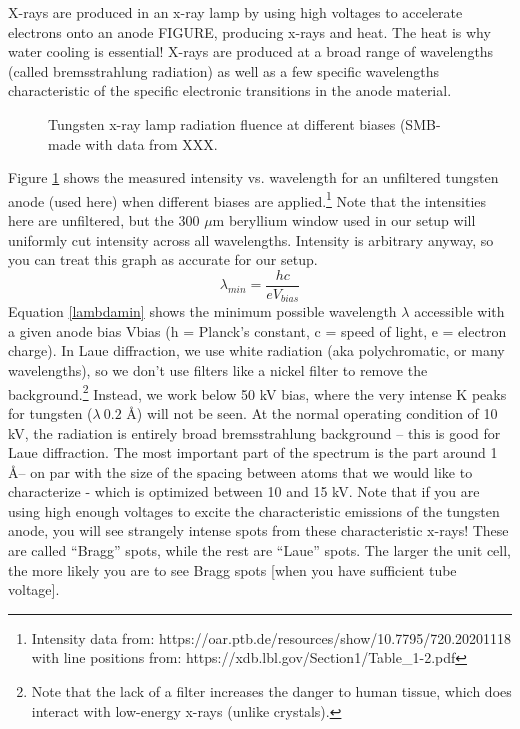 X-rays are produced in an x-ray lamp by using high voltages to accelerate electrons onto an anode FIGURE, producing x-rays and heat. The heat is why water cooling is essential! X-rays are produced at a broad range of wavelengths (called bremsstrahlung radiation) as well as a few specific wavelengths characteristic of the specific electronic transitions in the anode material.
\begin{figure}[htbp]
  \centering
  
  \caption{Tungsten x-ray lamp radiation fluence at different biases (SMB-made with data from XXX.}
  \label{Wradiation}
\end{figure}
Figure \ref{Wradiation} shows the measured intensity vs. wavelength for an unfiltered tungsten anode (used here) when different biases are applied.\footnote{Intensity data from: https://oar.ptb.de/resources/show/10.7795/720.20201118 with line positions from: https://xdb.lbl.gov/Section1/Table_1-2.pdf }  Note that the intensities here are unfiltered, but the 300 $\mu$m beryllium window used in our setup will uniformly cut intensity across all wavelengths. Intensity is arbitrary anyway, so you can treat this graph as accurate for our setup.
\begin{equation}
    \lambda_{min} = \frac{hc}{eV_{bias} }
    \label{lambdamin}
\end{equation}
Equation \ref{lambdamin} shows the minimum possible wavelength $\lambda$ accessible with a given anode bias Vbias (h = Planck’s constant, c = speed of light, e = electron charge). In Laue diffraction, we use white radiation (aka polychromatic, or many wavelengths), so we don’t use filters like a nickel filter to remove the background.\footnote{Note that the lack of a filter increases the danger to human tissue, which does interact with low-energy x-rays (unlike crystals).} Instead, we work below 50 kV bias, where the very intense K peaks for tungsten ($\lambda~0.2 $ \AA) will not be seen. At the normal operating condition of 10 kV, the radiation is entirely broad bremsstrahlung background – this is good for Laue diffraction. The most important part of the spectrum is the part around 1 \AA – on par with the size of the spacing between atoms that we would like to characterize - which is optimized between 10 and 15 kV.
Note that if you are using high enough voltages to excite the characteristic emissions of the tungsten anode, you will see strangely intense spots from these characteristic x-rays! These are called “Bragg” spots, while the rest are “Laue” spots. The larger the unit cell, the more likely you are to see Bragg spots [when you have sufficient tube voltage].
